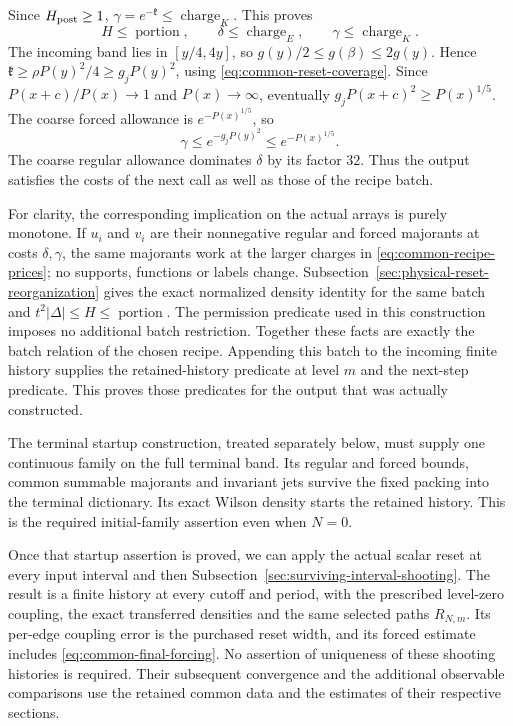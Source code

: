 Since $H_{\rm post}\ge1$, $\gamma=e^{-\mathfrak k}\le
\operatorname{charge}_K$. This proves
\begin{equation}\label{eq:common-recipe-prices}
 H\le\operatorname{portion},\qquad
 \delta\le\operatorname{charge}_E,\qquad
 \gamma\le\operatorname{charge}_K.
\end{equation}
The incoming band lies in $[y/4,4y]$, so
$g(y)/2\le g(\beta)\le2g(y)$. Hence
$\mathfrak k\ge\rho P(y)^2/4\ge g_jP(y)^2$, using
\eqref{eq:common-reset-coverage}. Since $P(x+c)/P(x)\to1$ and $P(x)\to\infty$, eventually
$g_jP(x+c)^2\ge P(x)^{1/5}$. The coarse forced allowance is
$e^{-P(x)^{1/5}}$, so
\begin{equation}\label{eq:common-final-forcing}
 \gamma\le e^{-g_jP(y)^2}\le e^{-P(x)^{1/5}}.
\end{equation}
The coarse regular allowance dominates $\delta$ by its factor $32$.
Thus the output satisfies the costs of the next call as well as those
of the recipe batch.

For clarity, the corresponding implication on the actual arrays is
purely monotone. If $u_i$ and $v_i$ are their nonnegative regular and
forced majorants at costs $\delta,\gamma$, the same majorants work
at the larger charges in \eqref{eq:common-recipe-prices}; no supports,
functions or labels change. Subsection~\ref{sec:physical-reset-reorganization}
gives the exact normalized density identity for the same batch and
$t^2|\Delta|\le H\le\operatorname{portion}$. The permission predicate
used in this construction imposes no additional batch restriction.
Together these facts are exactly the batch relation of the chosen
recipe. Appending this batch to the incoming finite history supplies
the retained-history predicate at level $m$ and the next-step predicate.
This proves those predicates for the output that was actually
constructed.

The terminal startup construction, treated separately below, must supply one
continuous family on the full terminal band. Its regular and forced
bounds, common summable majorants and invariant jets survive the
fixed packing into the terminal dictionary. Its exact Wilson density
starts the retained history. This is the required initial-family assertion even
when $N=0$.

Once that startup assertion is proved, we can apply the actual scalar reset at every input interval
and then Subsection~\ref{sec:surviving-interval-shooting}. The result is a
finite history at every cutoff and period, with the prescribed
level-zero coupling, the exact transferred densities and the same
selected paths $R_{N,m}$. Its per-edge coupling error is the purchased
reset width, and its forced estimate includes
\eqref{eq:common-final-forcing}. No assertion of uniqueness of these
shooting histories is required. Their subsequent convergence and the
additional observable comparisons use the retained common data and
the estimates of their respective sections.
